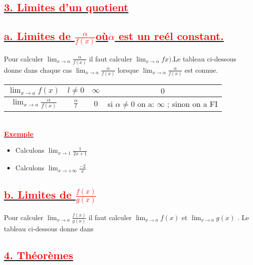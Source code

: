 \documentclass[12pt]{article}
\begin{document}
\subsection*{\underline{\textbf{\textcolor{red}{3. Limites d’un quotient}}}}
\subsection*{\underline{\textbf{\textcolor{red}{a. Limites de $\frac{\alpha}{f(x)}$où$\alpha$ est un reél constant.}}}}
Pour calculer $\lim_{x \to \alpha}\frac{\alpha}{f(x)}$ il faut calculer $\lim_{x \to \alpha}fx)$.Le tableau ci-dessous donne dans chaque cas $\lim_{x \to \alpha}\frac{\alpha}{f(x)}$
lorsque $\lim_{x \to \alpha}\frac{\alpha}{f(x)}$ est connue.\\
\begin{tabular}{|c|c|c|c|}
\hline
$\lim_{x \to a}f	(x)$ & $l\neq 0$ & $\infty$ & $0$\\
\hline
$\lim_{x \to a}\frac{\alpha}{f(x)}$ & $\frac{\alpha}{l}$ & $0$ &si $\alpha \neq 0$ on a: $\infty$ ; sinon on a FI\\
\hline
\end{tabular}\\
\underline{\textbf{\textcolor{red}{Exemple}}}
\begin{itemize}
\item Calculons $\lim_{x \to 1}\frac{1}{2x+1}$
\item Calculons $\lim_{x \to +\infty}\frac{-2}{x}$
\end{itemize}
\subsection*{\underline{\textbf{\textcolor{red}{b. Limites de $\frac{f(x)}{g(x)}$}}}}
Pour calculer $\lim_{x \to a}\frac{f(x)}{g(x)}$ il faut calculer $\lim_{x \to a}f(x)$ et 
$\lim_{x \to a}g(x)$ . Le tableau ci-dessous donne dans
\subsection*{\underline{\textbf{\textcolor{red}{4. Théorèmes}}}}
\end{document}
